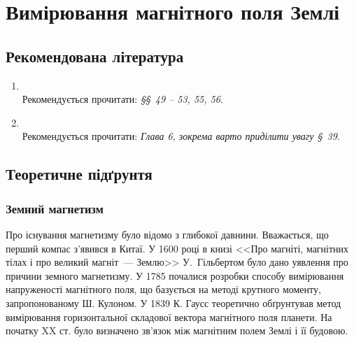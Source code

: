 
%
\expandafter\graphicspath\expandafter{\expandafter{\currfilebase/pic}}
\usetikzlibrary{arrows.meta}




\chapter{Вимірювання магнітного поля Землі}
\makeworktitle

\section*{Рекомендована література }
\begin{enumerate}
	\item {}\\[0.5ex]
	      Рекомендується прочитати: \emph{\S\S~49 -- 53, 55, 56}.
	\item {}\\[0.5ex]
	      Рекомендується прочитати: \emph{Глава 6, зокрема варто приділити увагу \S~39}.
\end{enumerate}


\section{Теоретичне підґрунтя}

\subsection{Земний магнетизм}

Про існування магнетизму було відомо з глибокої давнини. Вважається, що перший компас з'явився в Китаї. У 1600 році в книзі  <<Про магніті, магнітних тілах і про великий магніт~--- Землю>> У.~Гільбертом  було дано уявлення про причини земного магнетизму. У 1785 почалися розробки способу вимірювання напруженості магнітного поля, що базується на методі крутного моменту, запропонованому Ш. Кулоном. У 1839 К. Гаусс теоретично обґрунтував метод вимірювання горизонтальної складової вектора магнітного поля планети. На початку XX ст. було визначено зв'язок між магнітним полем Землі і її будовою.

